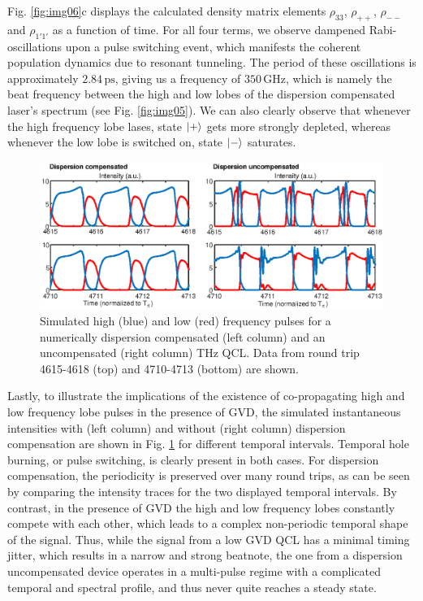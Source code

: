 \documentclass[10pt,letterpaper]{article}%
\begin{document}
Fig. \ref{fig:img06}c displays the calculated density matrix elements
$\rho_{33}$, $\rho_{++}$, $\rho_{--}$ and $\rho_{1'1'}$ as a function of time. 
For all four terms, we observe dampened Rabi-oscillations upon a pulse switching event, 
which manifests the coherent population dynamics due to resonant tunneling. The
period of these oscillations is approximately $2.84{\,}\mathrm{ps}$, giving us a frequency of $350{\,}\mathrm{GHz}$,
which is namely the beat frequency between the high and low lobes of the dispersion compensated laser's spectrum
(see Fig. \ref{fig:img05}). We can also clearly observe that whenever the high
frequency lobe lases, state $\Ket{+}$ gets more strongly depleted, whereas 
whenever the low lobe is switched on, state $\Ket{-}$ saturates. 

\begin{figure}[h]
\begin{center}
\includegraphics[width=12cm]{figs/TEMPHOLEBURNING.eps}
\end{center}
\caption{Simulated high (blue) and low (red) frequency pulses for a
numerically dispersion compensated (left column) and an uncompensated (right
column) THz QCL. Data from round trip 4615-4618 (top) and
4710-4713 (bottom) are shown.}%
\label{fig:img07}%
\end{figure}

Lastly, to illustrate the implications of the existence of co-propagating high
and low frequency lobe pulses in the presence of GVD, the simulated
instantaneous intensities with (left column) and without (right column)
dispersion compensation are shown in Fig. \ref{fig:img07} for different
temporal intervals. Temporal hole burning, or pulse switching, is clearly
present in both cases. For dispersion compensation, the periodicity is
preserved over many round trips, as can be seen by comparing the intensity
traces for the two displayed temporal intervals. By contrast, in the presence
of GVD the high and low frequency lobes constantly compete with each other,
which leads to a complex non-periodic temporal shape of the signal. Thus, while
the signal from a low GVD QCL has a minimal timing jitter, which results in a
narrow and strong beatnote, the one from a dispersion uncompensated device
operates in a multi-pulse regime with a complicated temporal and spectral
profile, and thus never quite reaches a steady state.
\end{document}
